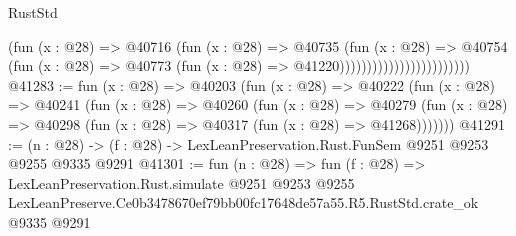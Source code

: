 \begin{lexlean}{RustStd}
\begin{coremodule}
                                          (fun (x : @28) =>
                                          @40716
                                            (fun (x : @28) =>
                                            @40735
                                              (fun (x : @28) =>
                                              @40754
                                                (fun (x : @28) =>
                                                @40773
                                                  (fun (x : @28) => @41220))))))))))))))))))))))))
@41283 := fun (x : @28) =>
  @40203
    (fun (x : @28) =>
    @40222
      (fun (x : @28) =>
      @40241
        (fun (x : @28) =>
        @40260
          (fun (x : @28) =>
          @40279 (fun (x : @28) => @40298 (fun (x : @28) => @40317 (fun (x : @28) => @41268)))))))
@41291 := (n : @28) -> (f : @28) -> LexLeanPreservation.Rust.FunSem @9251 @9253 @9255 @9335 @9291
@41301 := fun (n : @28) =>
  fun (f : @28) =>
  LexLeanPreservation.Rust.simulate
    @9251
    @9253
    @9255
    LexLeanPreserve.Ce0b3478670ef79bb00fc17648de57a55.R5.RustStd.crate_ok
    @9335
    @9291
\end{coremodule}
\end{lexlean}
